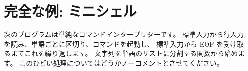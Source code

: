 \section{完全な例: ミニシェル}

次のプログラムは単純なコマンドインタープリターです。
標準入力から行入力を読み、単語ごとに区切り、コマンドを起動し、
標準入力から EOF を受け取るまでこれを繰り返します。
文字列を単語のリストに分割する関数から始めます。
このひどい処理についてはどうかノーコメントとさせてください。

